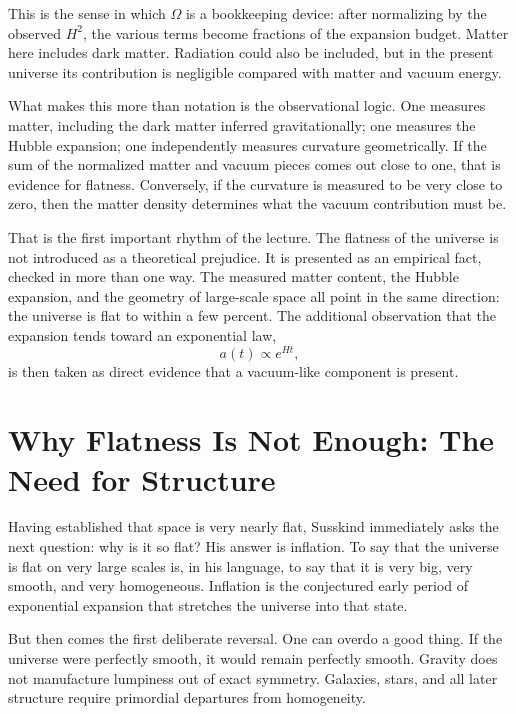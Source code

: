 This is the sense in which \(\Omega\) is a bookkeeping device: after normalizing by the observed \(H^2\), the various terms become fractions of the expansion budget. Matter here includes dark matter. Radiation could also be included, but in the present universe its contribution is negligible compared with matter and vacuum energy.

What makes this more than notation is the observational logic. One measures matter, including the dark matter inferred gravitationally; one measures the Hubble expansion; one independently measures curvature geometrically. If the sum of the normalized matter and vacuum pieces comes out close to one, that is evidence for flatness. Conversely, if the curvature is measured to be very close to zero, then the matter density determines what the vacuum contribution must be.

That is the first important rhythm of the lecture. The flatness of the universe is not introduced as a theoretical prejudice. It is presented as an empirical fact, checked in more than one way. The measured matter content, the Hubble expansion, and the geometry of large-scale space all point in the same direction: the universe is flat to within a few percent. The additional observation that the expansion tends toward an exponential law,
\begin{equation}
a(t)\propto e^{Ht},
\end{equation}
is then taken as direct evidence that a vacuum-like component is present.

\section{Why Flatness Is Not Enough: The Need for Structure}

Having established that space is very nearly flat, Susskind immediately asks the next question: why is it so flat? His answer is inflation. To say that the universe is flat on very large scales is, in his language, to say that it is very big, very smooth, and very homogeneous. Inflation is the conjectured early period of exponential expansion that stretches the universe into that state.

But then comes the first deliberate reversal. One can overdo a good thing. If the universe were perfectly smooth, it would remain perfectly smooth. Gravity does not manufacture lumpiness out of exact symmetry. Galaxies, stars, and all later structure require primordial departures from homogeneity.

